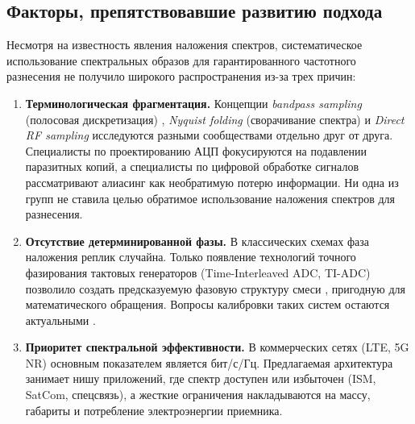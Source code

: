 \documentclass[a4paper,12pt]{article}
\numberwithin{equation}{section}
\begin{document}
\subsection{Факторы, препятствовавшие развитию подхода}
Несмотря на известность явления наложения спектров, систематическое использование спектральных образов для гарантированного частотного разнесения не получило широкого распространения из-за трех причин:

\begin{enumerate}
    \item \textbf{Терминологическая фрагментация.} Концепции \textit{bandpass sampling} (полосовая дискретизация) \cite{vaughan,harris,rajasekaran}, \textit{Nyquist folding} (сворачивание спектра) \cite{fudge,murray} и \textit{Direct RF sampling} исследуются разными сообществами отдельно друг от друга. Специалисты по проектированию АЦП фокусируются на подавлении паразитных копий, а специалисты по цифровой обработке сигналов рассматривают алиасинг как необратимую потерю информации. Ни одна из групп не ставила целью обратимое использование наложения спектров для разнесения.
    
    \item \textbf{Отсутствие детерминированной фазы.} В классических схемах фаза наложения реплик случайна. Только появление технологий точного фазирования тактовых генераторов (Time-Interleaved ADC, TI-ADC) позволило создать предсказуемую фазовую структуру смеси \cite{walden,tsai,rajeswaran}, пригодную для математического обращения. Вопросы калибровки таких систем остаются актуальными \cite{elbornsson}.
    
    \item \textbf{Приоритет спектральной эффективности.} В коммерческих сетях (LTE, 5G NR) основным показателем является бит/с/Гц. Предлагаемая архитектура занимает нишу приложений, где спектр доступен или избыточен (ISM, SatCom, спецсвязь), а жесткие ограничения накладываются на массу, габариты и потребление электроэнергии приемника.
\end{enumerate}
\end{document}
